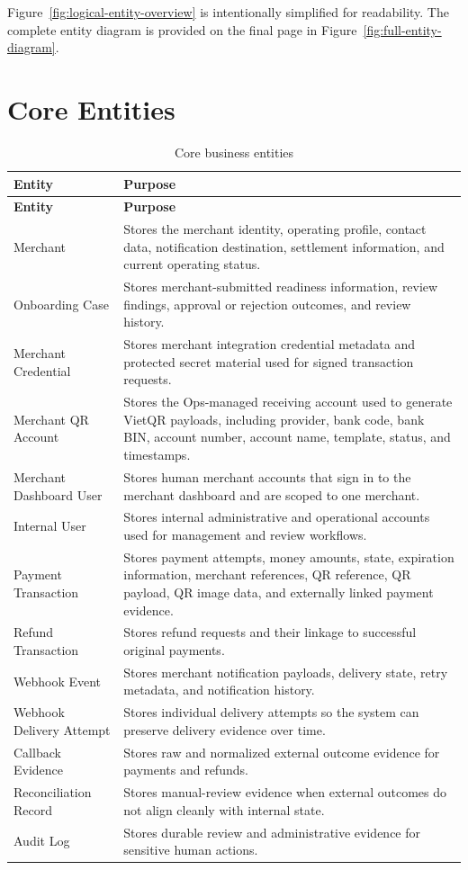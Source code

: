 Figure~\ref{fig:logical-entity-overview} is intentionally simplified for
readability. The complete entity diagram is provided on the final page in
Figure~\ref{fig:full-entity-diagram}.

\section{Core Entities}

\begin{longtable}{L{0.26\textwidth}L{0.64\textwidth}}
\caption{Core business entities}\\
\toprule
\textbf{Entity} & \textbf{Purpose} \\
\midrule
\endfirsthead
\toprule
\textbf{Entity} & \textbf{Purpose} \\
\midrule
\endhead
Merchant & Stores the merchant identity, operating profile, contact data, notification destination, settlement information, and current operating status. \\
\bodyrowrule
Onboarding Case & Stores merchant-submitted readiness information, review findings, approval or rejection outcomes, and review history. \\
\bodyrowrule
Merchant Credential & Stores merchant integration credential metadata and protected secret material used for signed transaction requests. \\
\bodyrowrule
Merchant QR Account & Stores the Ops-managed receiving account used to generate VietQR payloads, including provider, bank code, bank BIN, account number, account name, template, status, and timestamps. \\
\bodyrowrule
Merchant Dashboard User & Stores human merchant accounts that sign in to the merchant dashboard and are scoped to one merchant. \\
\bodyrowrule
Internal User & Stores internal administrative and operational accounts used for management and review workflows. \\
\bodyrowrule
Payment Transaction & Stores payment attempts, money amounts, state, expiration information, merchant references, QR reference, QR payload, QR image data, and externally linked payment evidence. \\
\bodyrowrule
Refund Transaction & Stores refund requests and their linkage to successful original payments. \\
\bodyrowrule
Webhook Event & Stores merchant notification payloads, delivery state, retry metadata, and notification history. \\
\bodyrowrule
Webhook Delivery Attempt & Stores individual delivery attempts so the system can preserve delivery evidence over time. \\
\bodyrowrule
Callback Evidence & Stores raw and normalized external outcome evidence for payments and refunds. \\
\bodyrowrule
Reconciliation Record & Stores manual-review evidence when external outcomes do not align cleanly with internal state. \\
\bodyrowrule
Audit Log & Stores durable review and administrative evidence for sensitive human actions. \\
\bottomrule
\end{longtable}

